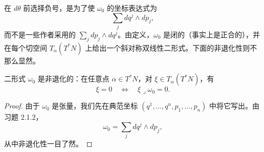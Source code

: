 在 $d\theta$ 前选择负号，是为了使 $\omega_0$ 的坐标表达式为
\[
  \sum_j dq^j\wedge dp_j,
\]
而不是一些作者采用的 $\sum_jdp_j\wedge dq^j$。由定义，$\omega_0$ 是闭的（事实上是正合的），并在每个切空间 $T_\alpha(T^*N)$ 上给出一个斜对称双线性二形式。下面的非退化性则不那么显然。

\begin{lemma}
\label{lem:canonical-form-nondegenerate}
二形式 $\omega_0$ 是非退化的：在任意点 $\alpha\in T^*N$，对 $\xi\in T_\alpha(T^*N)$，有
\[
  \xi=0\quad\Longleftrightarrow\quad \xi\mathbin{\lrcorner}\omega_0=0.
\]
\end{lemma}

\begin{proof}
由于 $\omega_0$ 是张量，我们先在典范坐标 $(q^1,\ldots,q^n,p_1,\ldots,p_n)$ 中将它写出。由习题 2.1.2，
\[
  \omega_0=\sum_jdq^j\wedge dp_j,
\]
从中非退化性一目了然。
\end{proof}
